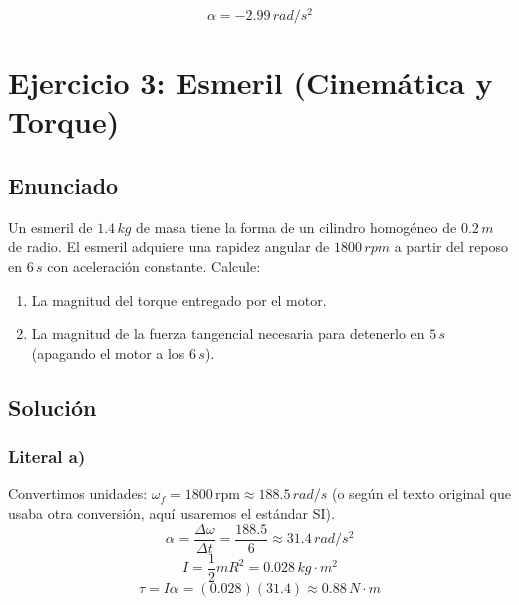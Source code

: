 \documentclass[12pt, a4paper]{article}
\begin{document}
\begin{tcolorbox}[colback=green!5!white, colframe=green!50!black, title=Respuesta Final]
$$ \alpha = -2.99 \, \si{rad/s^2} $$
\end{tcolorbox}

\newpage

\section*{Ejercicio 3: Esmeril (Cinemática y Torque)}

\subsection*{Enunciado}
Un esmeril de $1.4 \, \si{kg}$ de masa tiene la forma de un cilindro homogéneo de $0.2 \, \si{m}$ de radio. El esmeril adquiere una rapidez angular de $1800 \, \si{rpm}$ a partir del reposo en $6 \, \si{s}$ con aceleración constante. Calcule:
\begin{enumerate}[label=\alph*)]
    \item La magnitud del torque entregado por el motor.
    \item La magnitud de la fuerza tangencial necesaria para detenerlo en $5 \, \si{s}$ (apagando el motor a los $6 \, \si{s}$).
\end{enumerate}

\begin{center}
\end{center}

\subsection*{Solución}

\subsubsection*{Literal a)}
Convertimos unidades: $\omega_f = 1800 \, \text{rpm} \approx 188.5 \, \si{rad/s}$ (o según el texto original que usaba otra conversión, aquí usaremos el estándar SI).
$$ \alpha = \frac{\Delta \omega}{\Delta t} = \frac{188.5}{6} \approx 31.4 \, \si{rad/s^2} $$
$$ I = \frac{1}{2} m R^2 = 0.028 \, \si{kg \cdot m^2} $$
$$ \tau = I \alpha = (0.028)(31.4) \approx 0.88 \, \si{N \cdot m} $$
\end{document}
